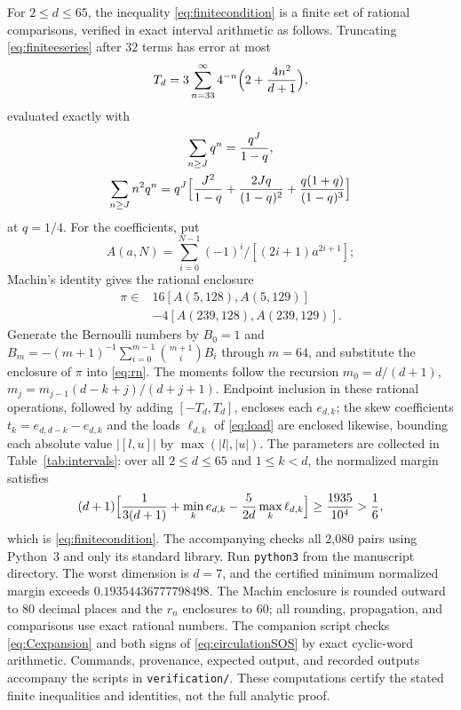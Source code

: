 \documentclass[aps,prl,reprint,superscriptaddress,longbibliography,floatfix,raggedbottom]{revtex4-2}
\newcommand{\abs}[1]{\lvert #1\rvert}
\begin{document}
For $2\le d\le65$, the inequality \eqref{eq:finitecondition} is a
finite set of rational comparisons, verified in exact interval
arithmetic \cite{Moore} as follows. Truncating
\eqref{eq:finiteeseries} after $32$ terms has error at most
\begin{equation}\label{eq:finitetail}
T_d=3\sum_{n=33}^\infty4^{-n}\Bigl(2+\frac{4n^2}{d+1}\Bigr),
\end{equation}
evaluated exactly with
\[
\begin{gathered}
\sum_{n\ge J}q^n=\frac{q^J}{1-q},\\
\sum_{n\ge J}n^2q^n
=q^J\Bigl[\frac{J^2}{1-q}+\frac{2Jq}{(1-q)^2}
+\frac{q(1+q)}{(1-q)^3}\Bigr]
\end{gathered}
\]
at $q=1/4$. For the coefficients, put
\[
A(a,N)=\sum_{i=0}^{N-1}(-1)^i/[(2i+1)a^{2i+1}];
\]
Machin's identity
gives the rational enclosure
\[
\begin{split}
\pi\in{}&16[A(5,128),A(5,129)]\\
&-4[A(239,128),A(239,129)].
\end{split}
\]
Generate the Bernoulli numbers by $B_0=1$ and
$B_m=-(m+1)^{-1}\sum_{i=0}^{m-1}\binom{m+1}iB_i$ through $m=64$, and
substitute the enclosure of $\pi$ into \eqref{eq:rn}. The moments
follow the recursion $m_0=d/(d+1)$,
$m_j=m_{j-1}(d-k+j)/(d+j+1)$. Endpoint inclusion in these rational
operations, followed by adding $[-T_d,T_d]$, encloses each $e_{d,k}$;
the skew coefficients $t_k=e_{d,d-k}-e_{d,k}$ and the loads
$\ell_{d,k}$ of \eqref{eq:load} are enclosed likewise, bounding each
absolute value $\abs{[l,u]}$ by $\max(\abs l,\abs u)$. The parameters
are collected in Table~\ref{tab:intervals}: over all $2\le d\le65$ and
$1\le k<d$, the normalized margin satisfies
\[
(d+1)\Bigl[\frac1{3(d+1)}+\min_k e_{d,k}
-\frac5{2d}\max_k\ell_{d,k}\Bigr]
\ge\frac{1935}{10^4}>\frac16,
\]
which is \eqref{eq:finitecondition}.
The accompanying  checks all
2,080 pairs using Python~3 and only its standard library. Run
\texttt{python3}  from the manuscript
directory. The worst dimension is $d=7$, and the certified minimum
normalized margin exceeds $0.19354436777798498$. The Machin enclosure is
rounded outward to 80 decimal places and the $r_n$ enclosures to 60;
all rounding, propagation, and comparisons use exact rational numbers.
The companion script 
checks \eqref{eq:Cexpansion} and both signs of
\eqref{eq:circulationSOS} by exact cyclic-word arithmetic.
Commands, provenance, expected output, and recorded outputs accompany
the scripts in \texttt{verification/}. These computations certify the
stated finite inequalities and identities, not the full analytic proof.
\end{document}
